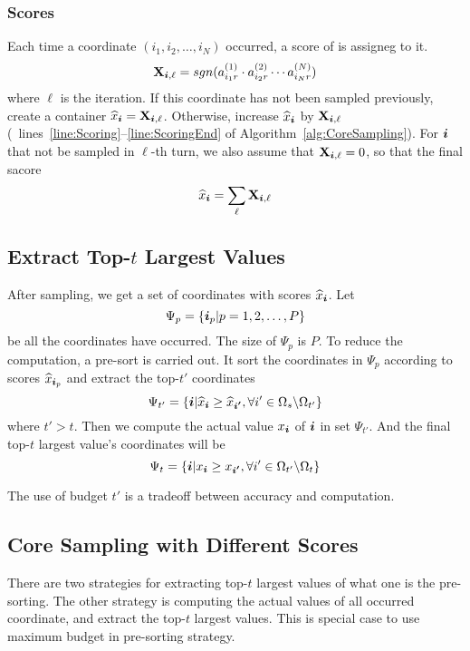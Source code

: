\documentclass[letterpaper]{article}
\newcommand{\Sca}[3]{{#1}^{(#2)}_{i_#2#3}}%
\newcommand{\V}[1]{{\bm{{\MakeLowercase{#1}}}}}
\newcommand{\M}[1]{{\bm{\mathbf{\MakeUppercase{#1}}}}}
\newcommand{\AlgLines}[3]{lines~\ref{line:#2}--\ref{line:#3} of Algorithm~\ref{alg:#1}}
\newcommand{\Coord}{(i_1,i_2,\ldots,i_N)}
\newcommand{\predx}{\widehat{x}_{\V{i}}}
\begin{document}
\subsubsection{Scores}
Each time a coordinate $\Coord $ occurred, a score of is assigneg to it.
\[
\M{X}_{\V{i},\ell}  = sgn(\Sca{a}{1}{r}\cdot\Sca{a}{2}{r}\cdots\Sca{a}{N}{r})
\]
where $\ell$ is the iteration.
If this coordinate has not been sampled previously,
create a container $\predx = \M{X}_{\V{i},\ell}$.
Otherwise, increase $\predx$ by $\M{X}_{\V{i},\ell}$
(~\AlgLines{CoreSampling}{Scoring}{ScoringEnd}).
For $\V{i}$ that not be sampled in $\ell$-th turn,
we also assume that $\M{X}_{\V{i},\ell}=0$,
so that the final sacore
\begin{equation}\label{eq:score}
\predx = \sum_{\ell} \M{X}_{\V{i},\ell}
\end{equation}

\subsection{Extract Top-$t$ Largest Values}
After sampling, we get a set of coordinates with scores $\predx$.
Let
\[
    \Psi_p = \{\V{i}_p|p = 1,2,\ldots,P\}
\]
be all the coordinates have occurred. The size of $\Psi_p$ is $P$.
To reduce the computation, a pre-sort is carried out.
It sort the coordinates in $\Psi_p$ according to scores $\widehat{x}_{\V{i}_p}$
and extract the top-$t'$ coordinates
\[
    \Psi_{t'} = \{ \V{i} | \predx \geq \widehat{x}_{\V{i'}},
                           \forall i'\in \Omega_{s} \backslash \Omega_{t'}
                \}
\]  where $t'>t$.
Then we compute the actual value $x_{\V{i}}$ of $\V{i}$ in set $\Psi_{t'}$.
And the final top-$t$ largest value's coordinates will be
\[
    \Psi_{t} =
                \{ \V{i} | x_{\V{i}}\geq x_{\V{i'}},
                           \forall i' \in \Omega_{t'} \backslash \Omega_{t}
                \}
\]

The use of budget $t'$ is a tradeoff between accuracy and computation.

\subsection{Core Sampling with Different Scores}
There are two strategies for extracting top-$t$ largest values of what one is the pre-sorting.
The other strategy is computing the actual values of all occurred coordinate,
and extract the top-$t$ largest values.
This is special case to use maximum budget in pre-sorting strategy.
\end{document}
